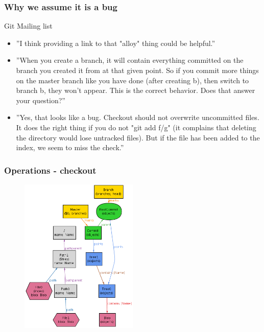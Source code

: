 \documentclass{beamer}
\begin{document}
\begin{frame}
   \frametitle{Why we assume it is a bug} \pause
   \begin{block}{Git Mailing list}
      \footnotesize
      \begin{itemize}
         \item ''I think providing a link to that "alloy" thing could
         be helpful.'' \pause
         \item ''When you create a branch, it will contain everything
         committed on the branch you created it from at that given
         point. So if you commit more things on the master branch like
         you have done (after creating b), then switch to branch b,
         they won't appear. This is the correct behavior. Does that
         answer your question?'' \pause
         \item ''Yes, that looks like a bug. Checkout should not
         overwrite uncommitted files. It does the right thing if you
         do not "git add f/g" (it complains that deleting the
         directory would lose untracked files). But if the file has
         been added to the index, we seem to miss the check.''
      \end{itemize}
   \end{block}
\end{frame}

\begin{frame}[fragile]
   \frametitle{Operations - checkout}
      \begin{figure}
         \centering
         \includegraphics[width=0.50\textwidth]{images/checkout1.png}
      \end{figure}
\end{frame}
\end{document}
